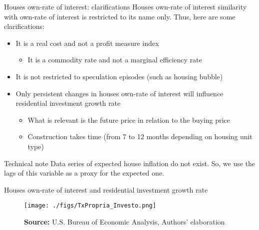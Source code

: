 \documentclass[10pt]{beamer}
\begin{document}
\begin{frame}[label={sec:org937ec2b}]{Houses own-rate of interest: clarifications}
\label{OwnClarification}
Houses own-rate of interest similarity with \textcite{keynes_general_1936} own-rate of interest is restricted to its name only.
Thus, here are some clarifications:

\begin{itemize}
\item It is a real cost and not a profit measure index
\begin{itemize}
\item It is a \alert{commodity rate} and not a marginal efficiency rate
\end{itemize}
\item It is not restricted to speculation episodes (such as housing bubble)
\item Only \alert{persistent} changes in houses own-rate of interest will influence residential investment growth rate
\begin{itemize}
\item What is relevant is the future price in relation to the buying price
\item Construction takes time (from 7 to 12 months depending on housing unit type) \hyperlink{constructionPlot}{}
\end{itemize}
\end{itemize}

\begin{block}{Technical note}
Data series of expected house inflation do not exist.
So, we use the lags of this variable as a proxy for the expected one.
\end{block}
\end{frame}

\begin{frame}[label={sec:orge0b3f30}]{Houses own-rate of interest and residential investment growth rate}
\begin{figure}[htb]
	\centering
	\texttt{[image: ./figs/TxPropria\_Investo.png]}
	\caption*{\textbf{Source:} U.S. Bureau of Economic Analysis, Authors' elaboration}
\end{figure}
\end{frame}
\end{document}
